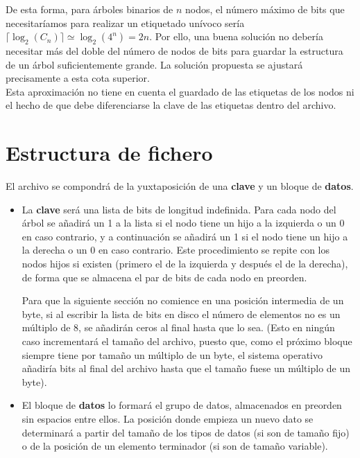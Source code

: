 \documentclass{article}
\begin{document}



De esta forma, para árboles binarios de $n$ nodos, el número máximo de bits que
necesitaríamos para realizar un etiquetado unívoco sería $\lceil \log_2(C_n)
\rceil \simeq \log_2(4^n) = 2n$. Por ello, una buena solución no debería necesitar
más del doble del número de nodos de bits para guardar la estructura de un
árbol suficientemente grande. La solución propuesta se ajustará precisamente a esta
cota superior. \\

Esta aproximación no tiene en cuenta el guardado de las etiquetas de los nodos ni
el hecho de que debe diferenciarse la clave de las etiquetas dentro del archivo.

\section{Estructura de fichero}

El archivo se compondrá de la yuxtaposición de una \textbf{clave} y un
bloque de \textbf{datos}.

\begin{itemize}
	\item La \textbf{clave} será una lista de bits de longitud indefinida.
  Para cada nodo del árbol se añadirá un 1 a la lista si el nodo tiene un hijo a
  la izquierda o un 0 en caso contrario, y a continuación se añadirá un 1 si el
  nodo tiene un hijo a la derecha o un 0 en caso contrario. Este procedimiento
  se repite con los nodos hijos si existen (primero el de la izquierda y después
  el de la derecha), de forma que se almacena el par de bits de cada nodo en preorden.

  Para que la siguiente sección no comience en una posición intermedia de un byte,
  si al escribir la lista de bits en disco el número de elementos no es un múltiplo
  de 8, se añadirán ceros al final hasta que lo sea. (Esto en ningún caso
  incrementará el tamaño del archivo, puesto que, como el próximo bloque siempre
  tiene por tamaño un múltiplo de un byte, el sistema operativo añadiría bits al
  final del archivo hasta que el tamaño fuese un múltiplo de un byte).

	\item El bloque de \textbf{datos} lo formará el grupo de datos, almacenados
  en preorden sin espacios entre ellos. La posición donde empieza un nuevo dato
  se determinará a partir del tamaño de los tipos de datos (si son de tamaño fijo)
  o de la posición de un elemento terminador (si son de tamaño variable).
\end{itemize}
\end{document}
